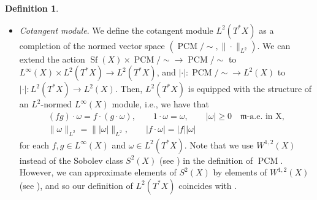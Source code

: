 \documentclass[10pt,a4paper]{amsart}
\numberwithin{equation}{section}
\theoremstyle{definition}
\newtheorem{Def}[Thm]{Definition}
\newcommand{\PCM}{\operatorname{PCM}}
\newcommand{\Sf}{\operatorname{Sf}}
\newcommand{\R}{\mathbb{R}}
\newcommand{\Z}{\mathbb{Z}}
\newcommand{\mf}{\mathfrak{m}}
\begin{document}
\begin{Def}
\begin{itemize}
\[
|D (f_i-g_j)|=0 \text{ $\mf$-a.e.\ in $A_i\cap B_j$ for each $i,j\in\Z_{>0}$}.
\]
We define
\begin{gather*}
|\cdot|\colon \PCM/{\sim} \to L^2(X),\qquad
[\{(f_i,A_i)\}]\mapsto \sum_{i=1}^\infty \chi_{A_i}|D f_i|,
\\
\|\cdot\|_{L^2}\colon \PCM/{\sim} \to [0,\infty),\quad [\{(f_i,A_i)\}]\mapsto\big\||[\{(f_i,A_i)\}]|\big\|_{L^2}\!
=\!\bigg(\!\sum_{i}\! \int_{A_i}\!\! |D f_i|^2\,{\rm d}\mf\!\bigg)^{1/2}\!\!\!,
\end{gather*}
where $\chi_{A_i}$ denotes the characteristic function.
Then, $(\PCM/{\sim},\|\cdot\|_{L^2})$ is naturally equipped with the structure of the normed vector space.
Moreover, we define
\[
\bigg(\sum_{i=1}^\infty a_i \chi_{A_i}\bigg)\cdot [\{(f_i,B_i)\}]:=[\{(a_i f_j,A_i\cap B_j)\}_{i,j}]
\]
for each $\sum_{i=1}^\infty a_i \chi_{A_i}\in \Sf(X)$ and $[\{(f_i,B_i)\}]\in \PCM/{\sim}$, where $\Sf(X)$ is defined by
\[
\Sf(X):=\left\{\sum_{i=1}^\infty a_i \chi_{A_i}\colon
\begin{array}{@{}l@{}}\text{$\{A_i\}_{i=1}^\infty$ is a pairwise disjoint family of Borel subsets of $X$}\\
\text{with $\bigcup_{i} A_i=X$, $a_i\in \R$ with $\sup_{i} |a_i|<\infty$}
\end{array} \right\} .
\]
Then, we have
$\|f\cdot \omega\|_{L^2}\leq \|f\|_{L^\infty}\|\omega\|_{L^2}$
for each $f\in\Sf(X)$ and $\omega\in \PCM/{\sim}$.
\item \emph{Cotangent module}. We define the cotangent module $L^2(T^\ast X)$ as a completion of the normed vector space $(\PCM/{\sim},\|\cdot\|_{L^2})$.
We can extend the action $\Sf(X)\times \PCM/{\sim}\to\PCM/{\sim}$ to $L^\infty(X)\times L^2(T^\ast X)\to L^2(T^\ast X)$, and
$|\cdot|\colon \PCM/{\sim} \to L^2(X)$ to $|\cdot|\colon L^2(T^\ast X) \to L^2(X)$.
Then, $L^2(T^\ast X)$ is equipped with the structure of an $L^2$-normed $L^\infty(X)$ module, i.e., we have that
\begin{gather*}
(f g)\cdot \omega=f\cdot (g\cdot \omega),\qquad
1\cdot \omega=\omega,\qquad
|\omega|\geq 0\quad \text{$\mf$-a.e.\ in X},
\\
\|\omega\|_{L^2}=\big\||\omega|\big\|_{L^2},\qquad
|f\cdot \omega|=|f||\omega|
\end{gather*}
for each $f,g\in L^\infty(X)$ and $\omega\in L^2(T^\ast X)$.
Note that we use $W^{1,2}(X)$ instead of the Sobolev class $S^2(X)$ (see \cite[Definition~2.1.4]{Gig}) in the definition of $\PCM$.
However, we can approximate elements of $S^2(X)$ by elements of $W^{1,2}(X)$ (see \cite[Proposition~2.2.5]{Gig}), and so our definition of $L^2(T^\ast X)$ coincides with \cite[Definition~2.2.1]{Gig}.

\end{itemize}
\end{Def}
\end{document}
